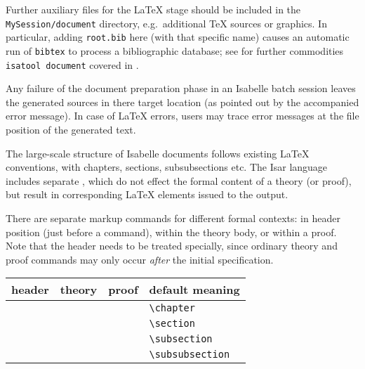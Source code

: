 \begin{isabellebody}
\begin{isamarkuptext}
  \medskip Further auxiliary files for the {\LaTeX} stage should be
  included in the \texttt{MySession/document} directory, e.g.\
  additional {\TeX} sources or graphics.  In particular, adding
  \texttt{root.bib} here (with that specific name) causes an automatic
  run of \texttt{bibtex} to process a bibliographic database; see for
  further commodities \texttt{isatool document} covered in
  \cite{isabelle-sys}.

  \medskip Any failure of the document preparation phase in an
  Isabelle batch session leaves the generated sources in there target
  location (as pointed out by the accompanied error message).  In case
  of {\LaTeX} errors, users may trace error messages at the file
  position of the generated text.%
\end{isamarkuptext}%
\isamarkuptrue%
%
\isamarkuptrue%
%
\begin{isamarkuptext}%
The large-scale structure of Isabelle documents follows existing
  {\LaTeX} conventions, with chapters, sections, subsubsections etc.
  The Isar language includes separate \bfindex{markup commands}, which
  do not effect the formal content of a theory (or proof), but result
  in corresponding {\LaTeX} elements issued to the output.

  There are separate markup commands for different formal contexts: in
  header position (just before a \isakeyword{theory} command), within
  the theory body, or within a proof.  Note that the header needs to
  be treated specially, since ordinary theory and proof commands may
  only occur \emph{after} the initial \isakeyword{theory}
  specification.

  \smallskip

  \begin{tabular}{llll}
  header & theory & proof & default meaning \\\hline
    & \commdx{chapter} & & \verb,\chapter, \\
  \commdx{header} & \commdx{section} & \commdx{sect} & \verb,\section, \\
    & \commdx{subsection} & \commdx{subsect} & \verb,\subsection, \\
    & \commdx{subsubsection} & \commdx{subsubsect} & \verb,\subsubsection, \\
  \end{tabular}


\end{isamarkuptext}
\end{isabellebody}
